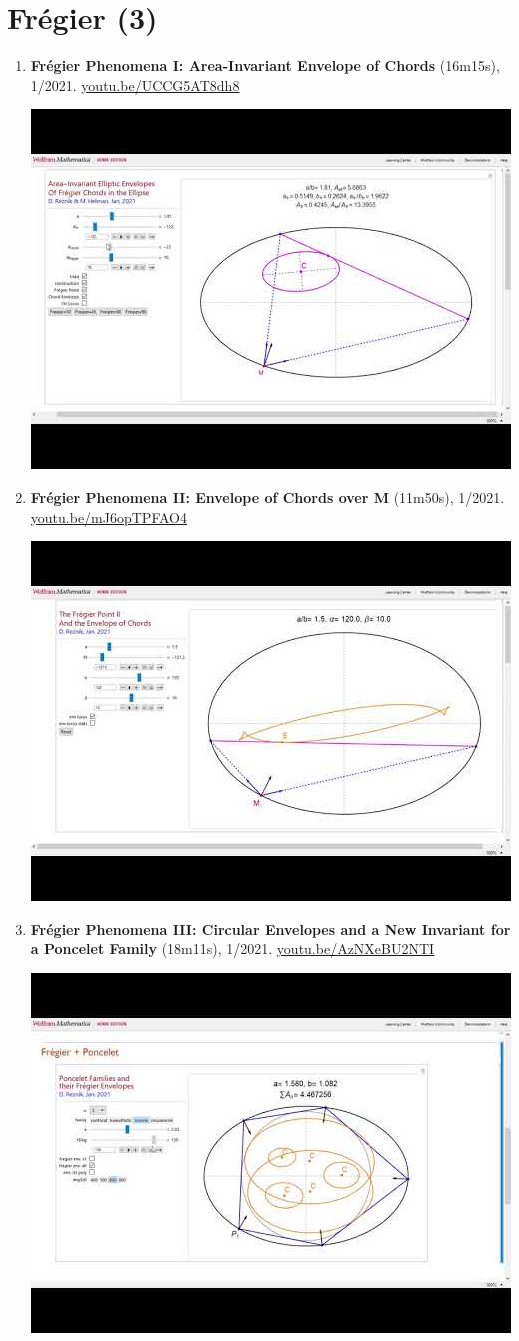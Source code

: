 \documentclass[12pt]{article}
\begin{document}
\section{Frégier (3)}

\begin{enumerate}[resume]
\item \textbf{Frégier Phenomena I: Area-Invariant Envelope of Chords} (16m15s), 1/2021. \href{https://youtu.be/UCCG5AT8dh8}{\url{youtu.be/UCCG5AT8dh8}}
\begin{center}\includegraphics[width=.5\textwidth]{pics/UCCG5AT8dh8.jpg}\end{center}
% 
\item \textbf{Frégier Phenomena II: Envelope of Chords over M} (11m50s), 1/2021. \href{https://youtu.be/mJ6opTPFAO4}{\url{youtu.be/mJ6opTPFAO4}}
\begin{center}\includegraphics[width=.5\textwidth]{pics/mJ6opTPFAO4.jpg}\end{center}
% 
\item \textbf{Frégier Phenomena III: Circular Envelopes and a New Invariant for a Poncelet Family} (18m11s), 1/2021. \href{https://youtu.be/AzNXeBU2NTI}{\url{youtu.be/AzNXeBU2NTI}}
\begin{center}\includegraphics[width=.5\textwidth]{pics/AzNXeBU2NTI.jpg}\end{center}
% 
\end{enumerate}
\end{document}
